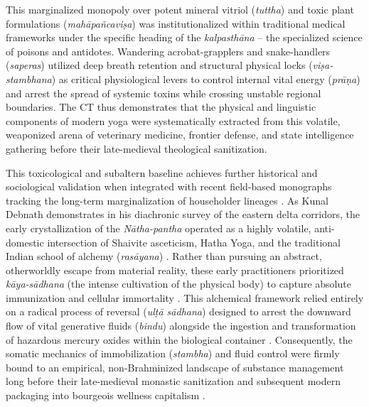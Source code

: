 \documentclass[11pt,twoside,letterpaper]{article}
\begin{document}
This marginalized monopoly over potent mineral vitriol (\textit{tuttha}) and toxic plant formulations (\textit{mahāpañcaviṣa}) was institutionalized within traditional medical frameworks under the specific heading of the \textit{kalpasthāna} – the specialized science of poisons and antidotes. Wandering acrobat-grapplers and snake-handlers (\textit{saperas}) utilized deep breath retention and structural physical locks (\textit{viṣa-stambhana}) as critical physiological levers to control internal vital energy (\textit{prāṇa}) and arrest the spread of systemic toxins while crossing unstable regional boundaries. The CT thus demonstrates that the physical and linguistic components of modern yoga were systematically extracted from this volatile, weaponized arena of veterinary medicine, frontier defense, and state intelligence gathering before their late-medieval theological sanitization.

This toxicological and subaltern baseline achieves further historical and sociological validation when integrated with recent field-based monographs tracking the long-term marginalization of householder lineages \citep{Debnath2024}. As Kunal Debnath demonstrates in his diachronic survey of the eastern delta corridors, the early crystallization of the \textit{Nātha-pantha} operated as a highly volatile, anti-domestic intersection of Shaivite asceticism, Hatha Yoga, and the traditional Indian school of alchemy (\textit{rasāyana}) \citep{Debnath2024}. Rather than pursuing an abstract, otherworldly escape from material reality, these early practitioners prioritized \textit{kāya-sādhana} (the intense cultivation of the physical body) to capture absolute immunization and cellular immortality \citep{Debnath2024}. This alchemical framework relied entirely on a radical process of reversal (\textit{ulṭā sādhana}) designed to arrest the downward flow of vital generative fluids (\textit{bindu}) alongside the ingestion and transformation of hazardous mercury oxides within the biological container \citep{Debnath2024}. Consequently, the somatic mechanics of immobilization (\textit{stambha}) and fluid control were firmly bound to an empirical, non-Brahminized landscape of substance management long before their late-medieval monastic sanitization and subsequent modern packaging into bourgeois wellness capitalism \citep{Debnath2024, mccartney2021}.
\end{document}
